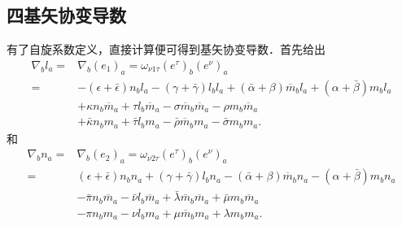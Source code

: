 \subsection{四基矢协变导数}
有了自旋系数定义，直接计算便可得到基矢协变导数．首先给出
\begin{equation}\label{chnull:eqn_covD-l}
    \begin{aligned}
        \nabla_{b} l_a =& \nabla_{b} (e_1)_a =
        \omega_{\nu 1 \tau}(e^\tau)_b (e^\nu)_a  \\
        =& -(\epsilon+\bar{\epsilon}) n_b l_a -(\gamma+\bar{\gamma}) l_b l_a
        +(\bar{\alpha}+\beta) \overline{m}_b l_a + (\alpha+\bar{\beta}) m_b l_a  \\
        & +\kappa n_b \overline{m}_a  +\tau l_b \overline{m}_a
        -\sigma \overline{m}_b \overline{m}_a  -\rho m_b \overline{m}_a  \\
        & +\bar{\kappa} n_b m_a + \bar{\tau} l_b m_a
        -\bar{\rho} \overline{m}_b m_a -\bar{\sigma} m_b m_a  .
    \end{aligned}
\end{equation}
和
\begin{equation}\label{chnull:eqn_covD-n}
    \begin{aligned}
        \nabla_{b} n_a =& \nabla_{b} (e_2)_a =
        \omega_{\nu 2 \tau}(e^\tau)_b (e^\nu)_a  \\
        =& (\epsilon+\bar{\epsilon}) n_b n_a + (\gamma+\bar{\gamma}) l_b n_a
        -(\bar{\alpha}+\beta)\overline{m}_b n_a - (\alpha+\bar{\beta})m_b n_a  \\
        & -\bar{\pi} n_b \overline{m}_a  -\bar{\nu} l_b \overline{m}_a
        +\bar{\lambda}\overline{m}_b \overline{m}_a  +\bar{\mu}m_b \overline{m}_a  \\
        & -\pi n_b m_a -\nu l_b m_a
        +\mu \overline{m}_b m_a+\lambda m_b m_a .
    \end{aligned}
\end{equation}
